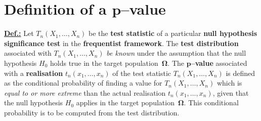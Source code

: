 \section[Definition of a $p$--value]{Definition of a 
$\boldsymbol{p}$--value}
\underline{\textbf{Def.:}} Let $T_{n}(X_{1}, \ldots, X_{n})$ be
the \textbf{test statistic} of a particular \textbf{null hypothesis
significance test} in the \textbf{frequentist framework}. The
\textbf{test distribution} associated with $T_{n}(X_{1}, \ldots,
X_{n})$ \textit{be known} under the assumption that the null
hypothesis $H_{0}$ holds true in the target
population~$\boldsymbol{\Omega}$. 
The $\boldsymbol{p}${\bf--value} associated with a \textbf{
realisation} $t_{n}(x_{1}, \ldots, x_{n})$ of the test statistic 
$T_{n}(X_{1}, \ldots, X_{n})$ is defined as the conditional 
probability of finding a value for $T_{n}(X_{1}, \ldots, X_{n})$  
which is \textit{equal to or more extreme} than the actual 
realisation $t_{n}(x_{1}, \ldots, x_{n})$, given that the null 
hypothesis $H_{0}$ applies in the target 
population~$\boldsymbol{\Omega}$. This conditional probability is
to be computed from the test distribution.

